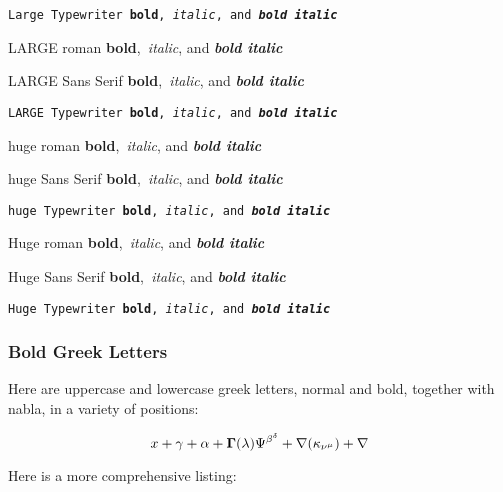 \documentclass{article}
\begin{document}
\texttt{{\Large Large Typewriter \textbf{bold},\textit{\ italic}, and 
\textbf{\textit{bold italic}}}}

{\LARGE LARGE roman \textbf{bold},\textit{\ italic}, and \textbf{\textit{%
bold italic}}}

\textsf{{\LARGE LARGE Sans Serif \textbf{bold},\textit{\ italic}, and 
\textbf{\textit{bold italic}}}}

\texttt{{\LARGE LARGE Typewriter \textbf{bold},\textit{\ italic}, and 
\textbf{\textit{bold italic}}}}

{\huge huge roman \textbf{bold},\textit{\ italic}, and \textbf{\textit{bold
italic}}}

\textsf{{\huge huge Sans Serif \textbf{bold},\textit{\ italic}, and \textbf{%
\textit{bold italic}}}}

\texttt{{\huge huge Typewriter \textbf{bold},\textit{\ italic}, and \textbf{%
\textit{bold italic}}}}

{\Huge Huge roman \textbf{bold},\textit{\ italic}, and \textbf{\textit{bold
italic}}}

\textsf{{\Huge Huge Sans Serif \textbf{bold},\textit{\ italic}, and \textbf{%
\textit{bold italic}}}}

\texttt{{\Huge Huge Typewriter \textbf{bold},\textit{\ italic}, and \textbf{%
\textit{bold italic}}}}

\subsubsection{Bold Greek Letters}

Here are uppercase and lowercase greek letters, normal and bold, together
with nabla, in a variety of positions:

\begin{equation*}
x+\gamma +\mathbf{\alpha }+\mathbf{\Gamma }(\lambda )\Psi ^{\mathbf{\beta }%
^\delta }+\nabla (\mathbf{\kappa }_{\nu ^{\mathbf{\mu }}}\mathbf{)}+\mathbf{%
\nabla }
\end{equation*}

Here is a more comprehensive listing:
\end{document}

